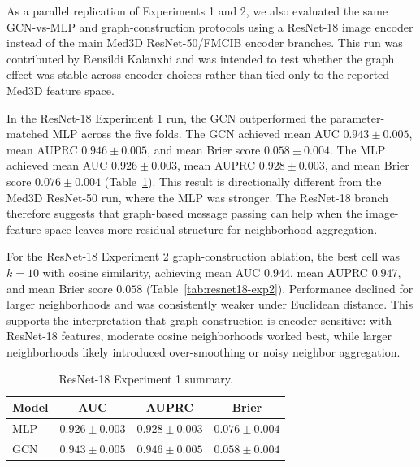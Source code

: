\documentclass[10pt,letterpaper,twocolumn]{article}
\begin{document}
As a parallel replication of Experiments 1 and 2, we also evaluated the same GCN-vs-MLP and graph-construction protocols using a ResNet-18 image encoder instead of the main Med3D ResNet-50/FMCIB encoder branches. This run was contributed by Rensildi Kalanxhi and was intended to test whether the graph effect was stable across encoder choices rather than tied only to the reported Med3D feature space.

In the ResNet-18 Experiment 1 run, the GCN outperformed the parameter-matched MLP across the five folds. The GCN achieved mean AUC $0.943 \pm 0.005$, mean AUPRC $0.946 \pm 0.005$, and mean Brier score $0.058 \pm 0.004$. The MLP achieved mean AUC $0.926 \pm 0.003$, mean AUPRC $0.928 \pm 0.003$, and mean Brier score $0.076 \pm 0.004$ (Table~\ref{tab:resnet18-exp1}). This result is directionally different from the Med3D ResNet-50 run, where the MLP was stronger. The ResNet-18 branch therefore suggests that graph-based message passing can help when the image-feature space leaves more residual structure for neighborhood aggregation.

For the ResNet-18 Experiment 2 graph-construction ablation, the best cell was $k = 10$ with cosine similarity, achieving mean AUC $0.944$, mean AUPRC $0.947$, and mean Brier score $0.058$ (Table~\ref{tab:resnet18-exp2}). Performance declined for larger neighborhoods and was consistently weaker under Euclidean distance. This supports the interpretation that graph construction is encoder-sensitive: with ResNet-18 features, moderate cosine neighborhoods worked best, while larger neighborhoods likely introduced over-smoothing or noisy neighbor aggregation.

\begin{table}[t]
\centering
\caption{ResNet-18 Experiment 1 summary.}
\label{tab:resnet18-exp1}
\small
\begin{tabular}{lccc}
\toprule
Model & AUC & AUPRC & Brier \\
\midrule
MLP & $0.926 \pm 0.003$ & $0.928 \pm 0.003$ & $0.076 \pm 0.004$ \\
GCN & $0.943 \pm 0.005$ & $0.946 \pm 0.005$ & $0.058 \pm 0.004$ \\
\bottomrule
\end{tabular}
\end{table}
\end{document}
